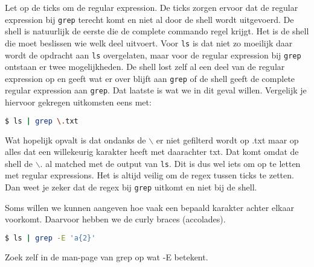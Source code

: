 Let op de ticks om de regular expression. De ticks zorgen ervoor dat de regular expression bij \texttt{grep} terecht komt en niet al door de shell wordt uitgevoerd. De shell is natuurlijk de eerste die de complete commando regel krijgt. Het is de shell die moet beslissen wie welk deel uitvoert. Voor \texttt{ls} is dat niet zo moeilijk  daar wordt de opdracht aan \texttt{ls} overgelaten, maar voor de regular expression bij \texttt{grep} ontstaan er twee mogelijkheden. De shell lost zelf al een deel van de regular expression op en geeft wat er over blijft aan \texttt{grep} of de shell geeft de complete regular expression aan \texttt{grep}. Dat laatste is wat we in dit geval willen. Vergelijk je hiervoor gekregen uitkomsten eens met:
\begin{lstlisting}[language=bash]
$ ls | grep \.txt
\end{lstlisting}
Wat hopelijk opvalt is dat ondanks de $\backslash$ er niet gefilterd wordt op .txt maar op alles dat een willekeurig karakter heeft met daarachter txt. Dat komt omdat de shell de $\backslash$. al matched met de output van \texttt{ls}. Dit is dus wel iets om op te letten met regular expressions. Het is altijd veilig om de regex tussen ticks te zetten. Dan weet je zeker dat de regex bij \texttt{grep} uitkomt en niet bij de shell.

Soms willen we kunnen aangeven hoe vaak een bepaald karakter achter elkaar voorkomt. Daarvoor hebben we de curly braces (accolades).
\begin{lstlisting}[language=bash]
$ ls | grep -E 'a{2}'
\end{lstlisting}
Zoek zelf in de man-page van grep op wat -E betekent.


